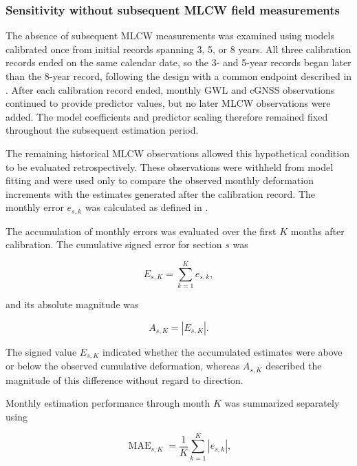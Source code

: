 \FloatBarrier

\subsubsection{Sensitivity without subsequent MLCW field measurements}
\label{subsec:permanent_stoppage_sensitivity}

The absence of subsequent MLCW measurements was examined using models calibrated once from initial records spanning 3, 5, or 8 years. All three calibration records ended on the same calendar date, so the 3- and 5-year records began later than the 8-year record, following the design with a common endpoint described in . After each calibration record ended, monthly GWL and cGNSS observations continued to provide predictor values, but no later MLCW observations were added. The model coefficients and predictor scaling therefore remained fixed throughout the subsequent estimation period.

The remaining historical MLCW observations allowed this hypothetical condition to be evaluated retrospectively. These observations were withheld from model fitting and were used only to compare the observed monthly deformation increments with the estimates generated after the calibration record. The monthly error $e_{s,k}$ was calculated as defined in .

The accumulation of monthly errors was evaluated over the first $K$ months after calibration. The cumulative signed error for section $s$ was

\begin{equation}
E_{s,K}
=
\sum_{k=1}^{K} e_{s,k},
\label{eq:stoppage_cumulative_signed_error}
\end{equation}

and its absolute magnitude was

\begin{equation}
A_{s,K}
=
\left|E_{s,K}\right|.
\label{eq:stoppage_absolute_cumulative_error}
\end{equation}

The signed value $E_{s,K}$ indicated whether the accumulated estimates were above or below the observed cumulative deformation, whereas $A_{s,K}$ described the magnitude of this difference without regard to direction.

Monthly estimation performance through month $K$ was summarized separately using

\begin{equation}
\operatorname{MAE}_{s,K}
=
\frac{1}{K}
\sum_{k=1}^{K}
\left|e_{s,k}\right|,
\label{eq:stoppage_running_mae}
\end{equation}

